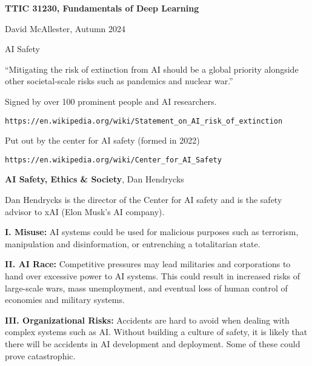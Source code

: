 




{\Huge

\centerline{\bf TTIC 31230, Fundamentals of Deep Learning}

\bigskip
\centerline{David McAllester, Autumn  2024}

\vfill
\centerline{AI Safety}

\vfill\vfill


``Mitigating the risk of extinction from AI should be a global priority alongside other societal-scale risks such as pandemics and nuclear war.''

\vfill
Signed by over 100 prominent people and AI researchers.

\vfill
{\huge
\begin{verbatim}
https://en.wikipedia.org/wiki/Statement_on_AI_risk_of_extinction
\end{verbatim}
}

\vfill
Put out by the center for AI safety (formed in 2022)

\vfill
{\huge
\begin{verbatim}
https://en.wikipedia.org/wiki/Center_for_AI_Safety
\end{verbatim}
}

{\bf AI Safety, Ethics \& Society}, Dan Hendrycks

\vfill
Dan Hendrycks is the director of the Center for AI safety and is the safety advisor to xAI (Elon Musk's AI company).

\vfill


{\bf I. Misuse:} AI systems could be used for malicious purposes such as terrorism, manipulation and disinformation, or entrenching a totalitarian state.

\vfill
{\bf II. AI Race:} Competitive pressures may lead militaries and corporations to hand over excessive power to AI systems. This could result in increased risks of large-scale wars, mass unemployment, and eventual loss of human control of economies and military systems.


{\bf III. Organizational Risks:} Accidents are hard to avoid when dealing with complex systems such as AI. Without building a culture of safety, it is likely that there will be accidents in AI development and deployment. Some of these could prove catastrophic.

}
